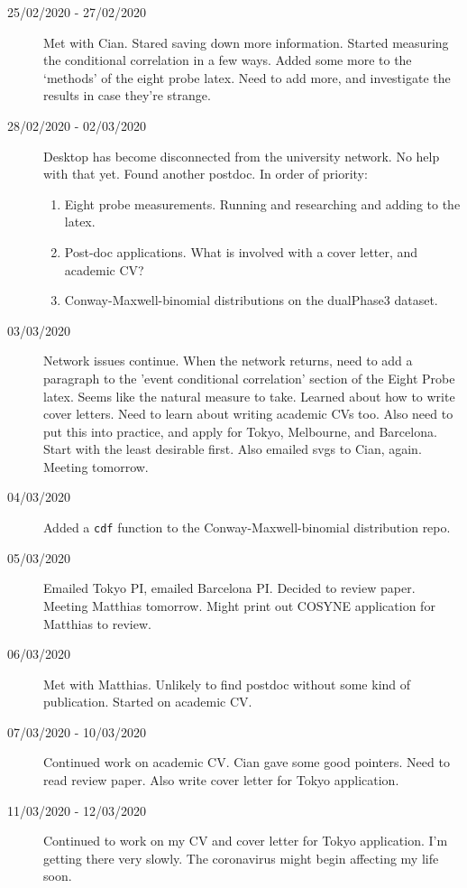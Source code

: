 \documentclass[a4paper,12pt]{article}
\theoremstyle{definition}
\begin{document}
\begin{description}
	\item[25/02/2020 - 27/02/2020] Met with Cian. Stared saving down more information. Started measuring the conditional correlation in a few ways. Added some more to the `methods' of the eight probe latex. Need to add more, and investigate the results in case they're strange.

	\item[28/02/2020 - 02/03/2020] Desktop has become disconnected from the university network. No help with that yet. Found another postdoc. In order of priority:
	\begin{enumerate}
		\item Eight probe measurements. Running and researching and adding to the latex.
		\item Post-doc applications. What is involved with a cover letter, and academic CV?
		\item Conway-Maxwell-binomial distributions on the dualPhase3 dataset.
	\end{enumerate}

	\item[03/03/2020] Network issues continue. When the network returns, need to add a paragraph to the 'event conditional correlation' section of the Eight Probe latex. Seems like the natural measure to take. Learned about how to write cover letters. Need to learn about writing academic CVs too. Also need to put this into practice, and apply for Tokyo, Melbourne, and Barcelona. Start with the least desirable first. Also emailed svgs to Cian, again. Meeting tomorrow.

	\item[04/03/2020] Added a \texttt{cdf} function to the Conway-Maxwell-binomial distribution repo.

	\item[05/03/2020] Emailed Tokyo PI, emailed Barcelona PI. Decided to review paper. Meeting Matthias tomorrow. Might print out COSYNE application for Matthias to review.

	\item[06/03/2020] Met with Matthias. Unlikely to find postdoc without some kind of publication. Started on academic CV.

	\item[07/03/2020 - 10/03/2020] Continued work on academic CV. Cian gave some good pointers. Need to read review paper. Also write cover letter for Tokyo application.

	\item[11/03/2020 - 12/03/2020] Continued to work on my CV and cover letter for Tokyo application. I'm getting there very slowly. The coronavirus might begin affecting my life soon.


\end{description}
\end{document}
